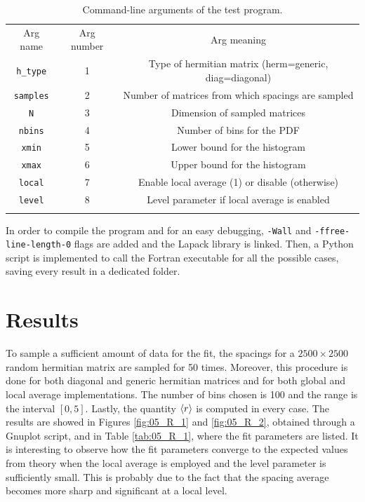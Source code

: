\documentclass[pra, onecolumn, notitlepage, floats, 11pt]{revtex4-1}
\newcommand{\code}[2][black]{\color{#1}\texttt{#2}}
\begin{document}
\begin{table}[!h]
    \begin{tabular}{ccc}
        \toprule
        Arg name    &   Arg number  &   Arg meaning \\
        \colrule
        \code{h\_type}  &   1   &   Type of hermitian matrix (herm=generic, diag=diagonal)  \\
        \code{samples}  &   2   &   Number of matrices from which spacings are sampled  \\
        \code{N}        &   3   &   Dimension of sampled matrices   \\
        \code{nbins}    &   4   &   Number of bins for the PDF  \\
        \code{xmin}     &   5   &   Lower bound for the histogram   \\
        \code{xmax}     &   6   &   Upper bound for the histogram   \\
        \code{local}    &   7   &   Enable local average (1) or disable (otherwise) \\
        \code{level}    &   8   &   Level parameter if local average is enabled \\
        \botrule
    \end{tabular}
    \caption{Command-line arguments of the test program.}
    \label{tab:05_C_SS_3_1}
\end{table}

In order to compile the program and for an easy debugging, \code{-Wall} and \code{-ffree-line-length-0} flags are added and the Lapack library is linked. Then, a Python script is implemented to call the Fortran executable for all the possible cases, saving every result in a dedicated folder.



\section{Results}
To sample a sufficient amount of data for the fit, the spacings for a \( 2500 \times 2500 \) random hermitian matrix are sampled for 50 times. Moreover, this procedure is done for both diagonal and generic hermitian matrices and for both global and local average implementations. The number of bins chosen is 100 and the range is the interval \( [0,5] \). Lastly, the quantity \( \expval{r} \) is computed in every case. The results are showed in Figures \ref{fig:05_R_1} and \ref{fig:05_R_2}, obtained through a Gnuplot script, and in Table \ref{tab:05_R_1}, where the fit parameters are listed. It is interesting to observe how the fit parameters converge to the expected values from theory when the local average is employed and the level parameter is sufficiently small. This is probably due to the fact that the spacing average becomes more sharp and significant at a local level.
\end{document}
